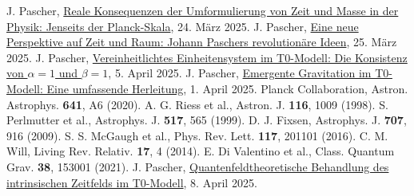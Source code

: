 \documentclass[12pt,a4paper]{article}
\begin{document}
\begin{thebibliography}{99}
		 J. Pascher, \href{https://github.com/jpascher/T0-Time-Mass-Duality/tree/main/2/pdf/Deutsch/Jenseits der Planck-Skala.pdf}{Reale Konsequenzen der Umformulierung von Zeit und Masse in der Physik: Jenseits der Planck-Skala}, 24. März 2025.
		 J. Pascher, \href{https://github.com/jpascher/T0-Time-Mass-Duality/tree/main/2/pdf/Deutsch/Eine neue Perspektive auf Zeit und Raum Johann Paschers revolution\%C3\%A4re Ideen.pdf}{Eine neue Perspektive auf Zeit und Raum: Johann Paschers revolutionäre Ideen}, 25. März 2025.
		 J. Pascher, \href{https://github.com/jpascher/T0-Time-Mass-Duality/tree/main/2/pdf/Deutsch/Die Konsistenz von alpha = 1 und beta = 1.pdf}{Vereinheitlichtes Einheitensystem im T0-Modell: Die Konsistenz von \(\alpha = 1\) und \(\beta = 1\)}, 5. April 2025.
		 J. Pascher, \href{https://github.com/jpascher/T0-Time-Mass-Duality/tree/main/2/pdf/Deutsch/Emergente Gravitation im T0-Modell Eine formale Herleitung.pdf}{Emergente Gravitation im T0-Modell: Eine umfassende Herleitung}, 1. April 2025.
		 Planck Collaboration, Astron. Astrophys. \textbf{641}, A6 (2020).
		 A. G. Riess et al., Astron. J. \textbf{116}, 1009 (1998).
		 S. Perlmutter et al., Astrophys. J. \textbf{517}, 565 (1999).
		 D. J. Fixsen, Astrophys. J. \textbf{707}, 916 (2009).
		 S. S. McGaugh et al., Phys. Rev. Lett. \textbf{117}, 201101 (2016).
		 C. M. Will, Living Rev. Relativ. \textbf{17}, 4 (2014).
		 E. Di Valentino et al., Class. Quantum Grav. \textbf{38}, 153001 (2021).
		 J. Pascher, \href{https://github.com/jpascher/T0-Time-Mass-Duality/tree/main/2/pdf/Deutsch/Quantenfeldtheoretische Behandlung des intrinsischen Zeitfelds im T0-Modell.pdf}{Quantenfeldtheoretische Behandlung des intrinsischen Zeitfelds im T0-Modell}, 8. April 2025.
	\end{thebibliography}
	
\end{document}
